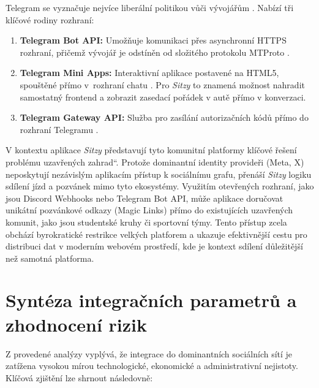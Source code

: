 \documentclass[male,czech,api_bc]{kitheses}
\newcommand{\UV}[1]{\quotedblbase#1\textquotedblleft}
\begin{document}
Telegram se vyznačuje nejvíce liberální politikou vůči vývojářům \cite{TelegramDocs2026}. Nabízí tři klíčové rodiny rozhraní:

\begin{enumerate}
    \item \textbf{Telegram Bot API:} Umožňuje komunikaci přes asynchronní HTTPS rozhraní, přičemž vývojář je odstíněn od složitého protokolu MTProto \cite{TelegramDocs2026}.
    \item \textbf{Telegram Mini Apps:} Interaktivní aplikace postavené na HTML5, spouštěné přímo v~rozhraní chatu \cite{TelegramDocs2026}. Pro \textit{Sitzy} to znamená možnost nahradit samostatný frontend a zobrazit zasedací pořádek v autě přímo v konverzaci.
    \item \textbf{Telegram Gateway API:} Služba pro zasílání autorizačních kódů přímo do rozhraní Telegramu \cite{TelegramDocs2026}.
\end{enumerate}

V kontextu aplikace \textit{Sitzy} představují tyto komunitní platformy klíčové řešení problému \UV{uzavřených zahrad}. Protože dominantní identity provideři (Meta, X) neposkytují nezávislým aplikacím přístup k sociálnímu grafu, přenáší \textit{Sitzy} logiku sdílení jízd a pozvánek mimo tyto ekosystémy. Využitím otevřených rozhraní, jako jsou Discord Webhooks nebo Telegram Bot API, může aplikace doručovat unikátní pozvánkové odkazy (Magic Links) přímo do existujících uzavřených komunit, jako jsou studentské kruhy či sportovní týmy. Tento přístup zcela obchází byrokratické restrikce velkých platforem a ukazuje efektivnější cestu pro distribuci dat v moderním webovém prostředí, kde je kontext sdílení důležitější než samotná platforma.

\section{Syntéza integračních parametrů a zhodnocení rizik}

Z provedené analýzy vyplývá, že integrace do dominantních sociálních sítí je zatížena vysokou mírou technologické, ekonomické a administrativní nejistoty. Klíčová zjištění lze shrnout následovně:
\end{document}

